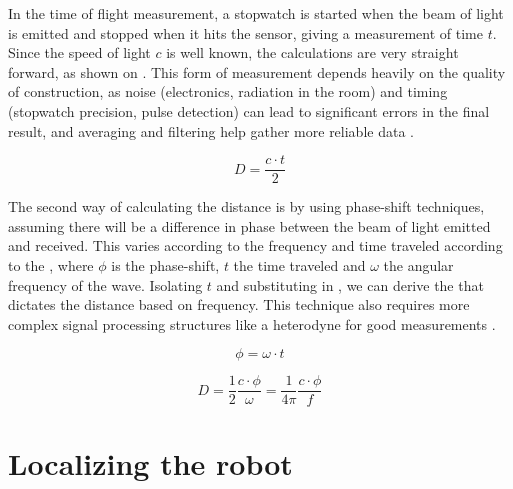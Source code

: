 In the time of flight measurement, a stopwatch is started when the beam of light is emitted and stopped when it hits the sensor, giving a measurement of time $t$. Since the speed of light $c$ is well known, the calculations are very straight forward, as shown on . This form of measurement depends heavily on the quality of construction, as noise (electronics, radiation in the room) and timing (stopwatch precision, pulse detection) can lead to significant errors in the final result, and averaging and filtering help gather more reliable data \cite{siegwart2011introduction}.

\begin{equation} \label{eq:d}
D = \frac{c \cdot t}{2}
\end{equation}

The second way of calculating the distance is by using phase-shift techniques, assuming there will be a difference in phase between the beam of light emitted and received. This varies according to the frequency and time traveled according to the , where $\phi$ is the phase-shift, $t$ the time traveled and $\omega$ the angular frequency of the wave. Isolating $t$ and substituting in , we can derive the  that dictates the distance based on frequency. This technique also requires more complex signal processing structures like a heterodyne for good measurements \cite{siegwart2011introduction}.

\begin{equation} \label{eq:omegat}
\phi = \omega \cdot t
\end{equation}

\begin{equation} \label{eq:d2}
D = \frac{1}{2} \frac{c \cdot \phi}{\omega} = \frac{1}{4 \pi} \frac{c \cdot \phi}{f}
\end{equation}



\section{Localizing the robot} \label{sec:localizing}


